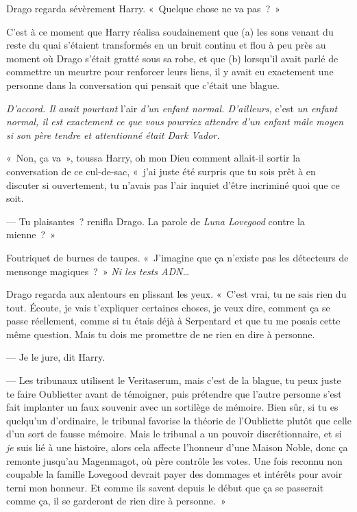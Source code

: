 Drago regarda sévèrement Harry. «~Quelque chose ne va pas~?~»

C'est à ce moment que Harry réalisa soudainement que (a) les sons venant du reste du quai s'étaient transformés en un bruit continu et flou à peu près au moment où Drago s'était gratté sous sa robe, et que (b) lorsqu'il avait parlé de commettre un meurtre pour renforcer leurs liens, il y avait eu exactement une personne dans la conversation qui pensait que c'était une blague.

\emph{D'accord. Il avait pourtant} l'air \emph{d'un enfant normal. D'ailleurs,} c'est \emph{un enfant normal, il est exactement ce que vous pourriez attendre d'un enfant mâle moyen si son père tendre et attentionné était Dark Vador.}

«~Non, ça va~», toussa Harry, oh mon Dieu comment allait-il sortir la conversation de ce cul-de-sac, «~j'ai juste été surpris que tu sois prêt à en discuter si ouvertement, tu n'avais pas l'air inquiet d'être incriminé quoi que ce soit.

--- Tu plaisantes~? renifla Drago.  La parole de \emph{Luna Lovegood} contre la mienne~?~»

Foutriquet de burnes de taupes. «~J'imagine que ça n'existe pas les détecteurs de mensonge magiques~?~» \emph{Ni les tests ADN…}

Drago regarda aux alentours en plissant les yeux.
«~C'est vrai, tu ne sais rien du tout.
Écoute, je vais t'expliquer certaines choses, je veux dire, comment ça se passe réellement, comme si tu étais déjà à Serpentard et que tu me posais cette même question.
Mais tu dois me promettre de ne rien en dire à personne.

--- Je le jure, dit Harry.

--- Les tribunaux utilisent le Veritaserum, mais c'est de la blague, tu peux juste te faire Oublietter avant de témoigner, puis prétendre que l'autre personne s'est fait implanter un faux souvenir avec un sortilège de mémoire.
Bien sûr, si tu es quelqu'un d'ordinaire, le tribunal favorise la théorie de l'Oubliette plutôt que celle d'un sort de fausse mémoire.
Mais le tribunal a un pouvoir discrétionnaire, et si \emph{je} suis lié à une histoire, alors cela affecte l'honneur d'une Maison Noble, donc ça remonte jusqu'au Magenmagot, où père contrôle les votes.
Une fois reconnu non coupable la famille Lovegood devrait payer des dommages et intérêts pour avoir terni mon honneur.
Et comme ils savent depuis le début que ça se passerait comme ça, il se garderont de rien dire à personne.~»

